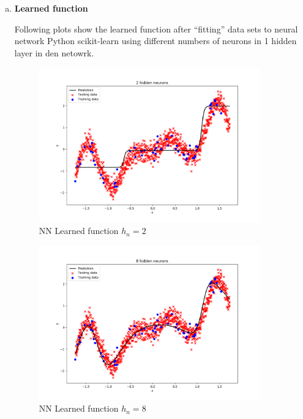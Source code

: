 \documentclass[12pt,a4paper]{article}
\begin{document}
\begin{enumerate}[a)]
  
  
  \item \textbf{Learned function}
  
Following plots show the learned function after ``fitting'' data sets to neural
network Python scikit-learn\autocite{scikit} using different numbers of neurons
in 1 hidden layer in den netowrk.
  
\begin{figure}[H]
	\centering
  \includegraphics[width=0.9\textwidth]{figures/1_1_a_hn_2.png}
	\caption{NN Learned function $h_n=2$}
	\label{1_1_a_hn_2}
\end{figure}

\begin{figure}[H]
	\centering
  \includegraphics[width=0.9\textwidth]{figures/1_1_a_hn_8.png}
	\caption{NN Learned function $h_n=8$}
	\label{1_1_a_hn_8}
\end{figure}


\end{enumerate}
\end{document}
